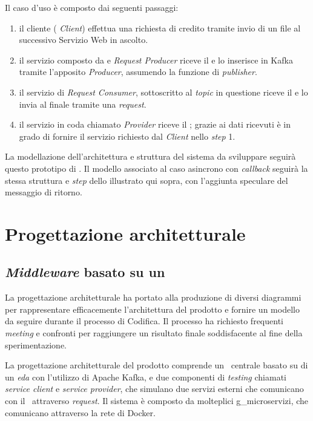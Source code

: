 \noindent
Il caso d'uso è composto dai seguenti passaggi:
\begin{enumerate}
  \item il cliente (\textit{ Client}) effettua una richiesta di credito tramite invio di un file  al successivo Servizio Web in ascolto.
  \item il servizio composto da   e \textit{Request Producer} riceve il  e lo inserisce in Kafka tramite l'apposito \textit{Producer}, assumendo la funzione di \textit{publisher}.
  \item il servizio di \textit{Request Consumer}, sottoscritto al \textit{topic} in questione riceve il  e lo invia al  finale tramite una  \textit{request}.
  \item il servizio in coda chiamato  \textit{Provider} riceve il ; grazie ai dati ricevuti è in grado di fornire il servizio richiesto dal \textit{Client} nello \textit{step} 1.
\end{enumerate}

La modellazione dell'architettura e struttura del sistema da sviluppare seguirà questo prototipo di .
Il modello associato al caso asincrono con \textit{callback} seguirà la stessa struttura e \textit{step} dello  illustrato qui sopra, con l'aggiunta speculare del messaggio di ritorno.

\section{Progettazione architetturale}\label{sec:progettazione}
\subsection{\textit{Middleware} basato su un }

La progettazione architetturale ha portato alla produzione di diversi diagrammi  per rappresentare efficacemente l'architettura del prodotto e fornire un modello da seguire durante il processo di Codifica.
Il processo ha richiesto frequenti \textit{meeting} e confronti per raggiungere un risultato finale soddisfacente al fine della sperimentazione.

La progettazione architetturale del prodotto comprende un \middleware\ centrale basato su di un \textit{\acrlong{eda}} con l'utilizzo di Apache Kafka, e due componenti di \textit{testing} chiamati \textit{service client} e \textit{service provider}, che simulano due servizi esterni che comunicano con il \middleware\ attraverso  \textit{request}.
Il sistema è composto da molteplici \gls{g_microservizi}, che comunicano attraverso la rete di Docker.

